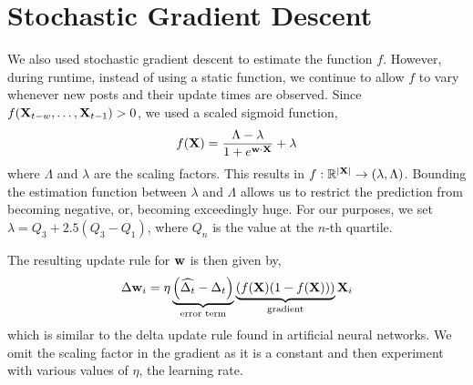 \section{Stochastic Gradient Descent}
We also used stochastic gradient descent to estimate the function $f$.  However, 
during runtime, instead of using a static function, we continue to allow $f$ to 
vary whenever new posts and their update times are observed.
Since $f(\mathbf{X}_{t-w},\hdots,\mathbf{X}_{t-1}) > 0$, we used a scaled sigmoid function,
\[
	f(\mathbf{X}) = \frac{\Lambda-\lambda}{1 + e^{\mathbf{w} \cdot \mathbf{X}}} + \lambda
\]
where $\Lambda$ and $\lambda$ are the scaling factors. This results in $f: 
\mathbb{R}^{|\mathbf{X}|}  \rightarrow (\lambda,\Lambda)$. Bounding the estimation 
function between $\lambda$ and $\Lambda$ allows us to restrict the prediction 
from becoming negative, or, becoming exceedingly huge. For our purposes, we set 
$\lambda = Q_3 + 2.5(Q_{3} - Q_{1})$, where $Q_n$ is the value at the $n$-th 
quartile. 

The resulting update rule for $\mathbf{w}$ is then given by,
\[
	\Delta \mathbf{w}_i = \eta
				\underbrace{\left(\widehat{\Delta_t} - \Delta_t \right)}_{\text{error term}}
				\underbrace{\left( f(\mathbf{X})(1-f(\mathbf{X})) \right)}_{\text{gradient}}
						\mathbf{X}_i
\]
which is similar to the delta update rule found in artificial neural networks.  
We omit the scaling factor in the gradient as it is a constant and then 
experiment with various values of $\eta$, the learning rate. 

